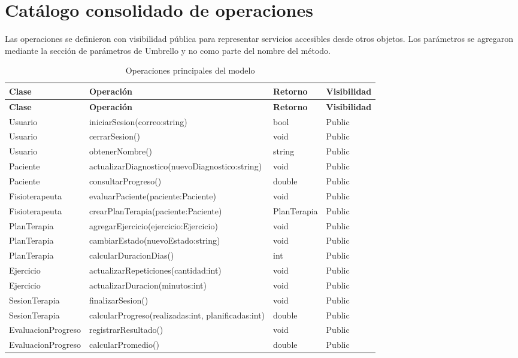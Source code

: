 \section{Catálogo consolidado de operaciones}
Las operaciones se definieron con visibilidad pública para representar servicios accesibles desde otros objetos. Los parámetros se agregaron mediante la sección de parámetros de Umbrello y no como parte del nombre del método.

\begin{longtable}{L{3.4cm}L{5.4cm}L{3cm}L{2.8cm}}
\caption{Operaciones principales del modelo}\\
\toprule
\textbf{Clase} & \textbf{Operación} & \textbf{Retorno} & \textbf{Visibilidad} \\
\midrule
\endfirsthead
\toprule
\textbf{Clase} & \textbf{Operación} & \textbf{Retorno} & \textbf{Visibilidad} \\
\midrule
\endhead
Usuario & iniciarSesion(correo:string) & bool & Public \\
Usuario & cerrarSesion() & void & Public \\
Usuario & obtenerNombre() & string & Public \\
Paciente & actualizarDiagnostico(nuevoDiagnostico:string) & void & Public \\
Paciente & consultarProgreso() & double & Public \\
Fisioterapeuta & evaluarPaciente(paciente:Paciente) & void & Public \\
Fisioterapeuta & crearPlanTerapia(paciente:Paciente) & PlanTerapia & Public \\
PlanTerapia & agregarEjercicio(ejercicio:Ejercicio) & void & Public \\
PlanTerapia & cambiarEstado(nuevoEstado:string) & void & Public \\
PlanTerapia & calcularDuracionDias() & int & Public \\
Ejercicio & actualizarRepeticiones(cantidad:int) & void & Public \\
Ejercicio & actualizarDuracion(minutos:int) & void & Public \\
SesionTerapia & finalizarSesion() & void & Public \\
SesionTerapia & calcularProgreso(realizadas:int, planificadas:int) & double & Public \\
EvaluacionProgreso & registrarResultado() & void & Public \\
EvaluacionProgreso & calcularPromedio() & double & Public \\
\bottomrule
\end{longtable}

